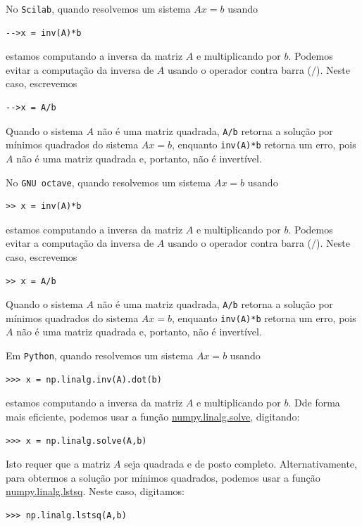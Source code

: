 \ifisscilab
\begin{obs}
  No \verb+Scilab+, quando resolvemos um sistema $Ax = b$ usando
\begin{verbatim}
-->x = inv(A)*b
\end{verbatim}
estamos computando a inversa da matriz $A$ e multiplicando por $b$. Podemos evitar a computação da inversa de $A$ usando o operador contra barra ($/$). Neste caso, escrevemos
\begin{verbatim}
-->x = A/b
\end{verbatim}
Quando o sistema $A$ não é uma matriz quadrada, \verb+A/b+ retorna a solução por mínimos quadrados do sistema $Ax = b$, enquanto \verb+inv(A)*b+ retorna um erro, pois $A$ não é uma matriz quadrada e, portanto, não é invertível.
\end{obs}
\fi
\ifisoctave
\begin{obs}
  No \verb+GNU octave+, quando resolvemos um sistema $Ax = b$ usando
\begin{verbatim}
>> x = inv(A)*b
\end{verbatim}
estamos computando a inversa da matriz $A$ e multiplicando por $b$. Podemos evitar a computação da inversa de $A$ usando o operador contra barra ($/$). Neste caso, escrevemos
\begin{verbatim}
>> x = A/b
\end{verbatim}
Quando o sistema $A$ não é uma matriz quadrada, \verb+A/b+ retorna a solução por mínimos quadrados do sistema $Ax = b$, enquanto \verb+inv(A)*b+ retorna um erro, pois $A$ não é uma matriz quadrada e, portanto, não é invertível.
\end{obs}
\fi
\ifispython
\begin{obs}
  Em \verb+Python+, quando resolvemos um sistema $Ax = b$ usando
\begin{verbatim}
>>> x = np.linalg.inv(A).dot(b)
\end{verbatim}
estamos computando a inversa da matriz $A$ e multiplicando por $b$. Dde forma mais eficiente, podemos usar a função \href{https://docs.scipy.org/doc/numpy/reference/generated/numpy.linalg.solve.html}{numpy.linalg.solve}, digitando:
\begin{verbatim}
>>> x = np.linalg.solve(A,b)
\end{verbatim}
Isto requer que a matriz $A$ seja quadrada e de posto completo. Alternativamente, para obtermos a solução por mínimos quadrados, podemos usar a função \href{https://docs.scipy.org/doc/numpy/reference/generated/numpy.linalg.lstsq.html}{numpy.linalg.lstsq}. Neste caso, digitamos:
\begin{verbatim}
>>> np.linalg.lstsq(A,b)
\end{verbatim}
\end{obs}
\fi

